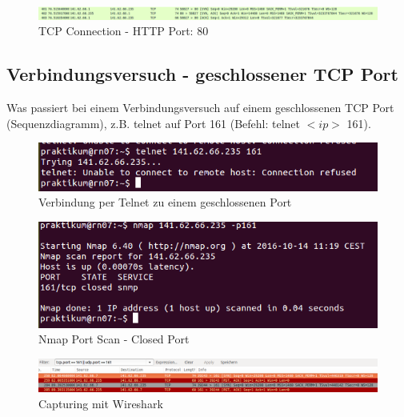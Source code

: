 \documentclass[a4paper]{report}
\begin{document}
\begin{figure}[htb]
	\centering
		\includegraphics[width=1.25\textwidth]{laborergebnisse/screenshots/a_1.png}
	\caption{TCP Connection - HTTP Port: 80}
	\label{fig:tcpconnection}
\end{figure}

\subsection{Verbindungsversuch - geschlossener TCP Port}
Was passiert bei einem Verbindungsversuch auf einem geschlossenen TCP Port
(Sequenzdiagramm), z.B. telnet auf Port 161 (Befehl: telnet $<ip>$ 161).


\begin{figure}[htb]
	\centering
		\includegraphics[width=1.25\textwidth]{laborergebnisse/screenshots/a_2-0.png}
	\caption{Verbindung per Telnet zu einem geschlossenen Port}
	\label{fig:tcpconnection}
\end{figure}

\begin{figure}[htb]
	\centering
		\includegraphics[width=1.25\textwidth]{laborergebnisse/screenshots/a_2-1.png}
	\caption{Nmap Port Scan - Closed Port}
	\label{fig:tcpconnection}
\end{figure}

\begin{figure}[htb]
	\centering
		\includegraphics[width=1.25\textwidth]{laborergebnisse/screenshots/a_2-2.png}
	\caption{Capturing mit Wireshark}
	\label{fig:capturingwireshark1}
\end{figure}
\end{document}

